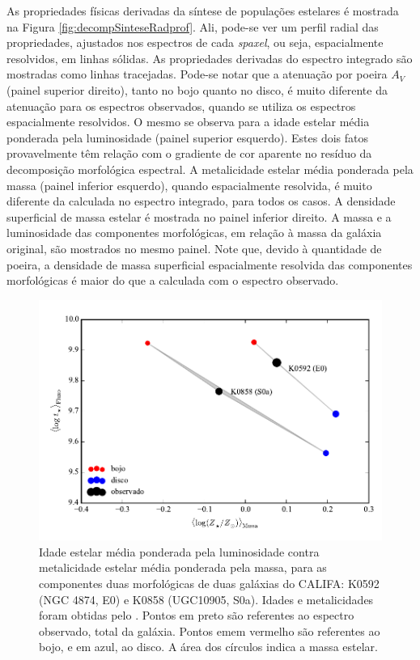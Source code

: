 As propriedades físicas derivadas da síntese de populações estelares é mostrada
na Figura \ref{fig:decompSinteseRadprof}. Ali, pode-se ver um perfil radial das
propriedades, ajustados nos espectros de cada {\em spaxel}, ou seja,
espacialmente resolvidos, em linhas sólidas. As propriedades derivadas do
espectro integrado são mostradas como linhas tracejadas. Pode-se notar que a
atenuação por poeira $A_V$ (painel superior direito), tanto no bojo quanto no
disco, é muito diferente da atenuação para os espectros observados, quando se
utiliza os espectros espacialmente resolvidos. O mesmo se observa para a idade
estelar média ponderada pela luminosidade (painel superior esquerdo). Estes dois
fatos provavelmente têm relação com o gradiente de cor aparente no resíduo da
decomposição morfológica espectral. A metalicidade estelar média ponderada pela
massa (painel inferior esquerdo), quando espacialmente resolvida, é muito
diferente da calculada no espectro integrado, para todos os casos. A densidade
superficial de massa estelar é mostrada no painel inferior direito. A massa e a
luminosidade das componentes morfológicas, em relação à massa da galáxia
original, são mostrados no mesmo painel. Note que, devido à quantidade de
poeira, a densidade de massa superficial espacialmente resolvida das componentes
morfológicas é maior do que a calculada com o espectro observado.

\begin{figure}
	\includegraphics{figuras/sample006a_synthesis_all2}
	\caption[Idade e metalicidade médios das componentes morfológicas]
	{Idade estelar média ponderada pela luminosidade contra metalicidade estelar
	média ponderada pela massa, para as componentes duas morfológicas de
	duas galáxias do CALIFA: K0592 (NGC 4874, E0) e K0858 (UGC10905, S0a). Idades
	e metalicidades foram obtidas pelo \starlight. Pontos em preto são referentes
	ao espectro observado, total da galáxia. Pontos emem vermelho são referentes
	ao bojo, e em azul, ao disco. A área dos círculos indica a massa estelar.}
	\label{fig:decompSintese}
\end{figure}


